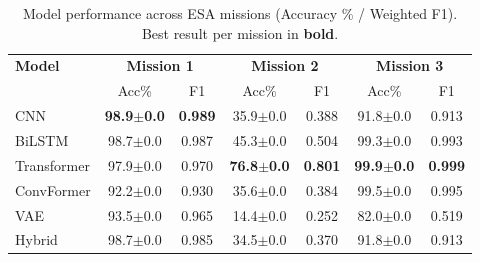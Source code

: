 \begin{table}[ht]
\centering
\caption{Model performance across ESA missions (Accuracy \% / Weighted F1). Best result per mission in \textbf{bold}.}
\label{tab:results}
\begin{tabular}{l|cc|cc|cc}
\hline
\textbf{Model} & \multicolumn{2}{c|}{\textbf{Mission 1}} & \multicolumn{2}{c|}{\textbf{Mission 2}} & \multicolumn{2}{c}{\textbf{Mission 3}} \\
 & Acc\% & F1 & Acc\% & F1 & Acc\% & F1 \\
\hline
CNN & \textbf{98.9$\pm$0.0} & \textbf{0.989} & 35.9$\pm$0.0 & 0.388 & 91.8$\pm$0.0 & 0.913 \\
BiLSTM & 98.7$\pm$0.0 & 0.987 & 45.3$\pm$0.0 & 0.504 & 99.3$\pm$0.0 & 0.993 \\
Transformer & 97.9$\pm$0.0 & 0.970 & \textbf{76.8$\pm$0.0} & \textbf{0.801} & \textbf{99.9$\pm$0.0} & \textbf{0.999} \\
ConvFormer & 92.2$\pm$0.0 & 0.930 & 35.6$\pm$0.0 & 0.384 & 99.5$\pm$0.0 & 0.995 \\
VAE & 93.5$\pm$0.0 & 0.965 & 14.4$\pm$0.0 & 0.252 & 82.0$\pm$0.0 & 0.519 \\
Hybrid & 98.7$\pm$0.0 & 0.985 & 34.5$\pm$0.0 & 0.370 & 91.8$\pm$0.0 & 0.913 \\
\hline
\end{tabular}
\end{table}